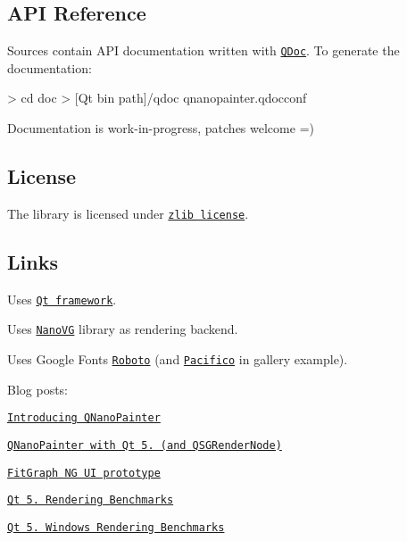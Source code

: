 \subsection*{A\+PI Reference}

Sources contain A\+PI documentation written with \href{http://doc.qt.io/qt-5/qdoc-index.html}{\tt Q\+Doc}. To generate the documentation\+:


\begin{DoxyCode}
> cd doc
> [Qt bin path]/qdoc qnanopainter.qdocconf 
\end{DoxyCode}
 Documentation is work-\/in-\/progress, patches welcome =)

\subsection*{License}

The library is licensed under \href{LICENSE.txt}{\tt zlib license}.

\subsection*{Links}


\begin{DoxyItemize}
\item Uses \href{http://www.qt.io}{\tt Qt framework}.
\item Uses \href{http://github.com/memononen/nanovg}{\tt Nano\+VG} library as rendering backend.
\item Uses Google Fonts \href{http://www.google.com/fonts/specimen/Roboto}{\tt Roboto} (and \href{http://www.google.com/fonts/specimen/Pacifico}{\tt Pacifico} in gallery example).
\item Blog posts\+:
\begin{DoxyItemize}
\item \href{http://kgronholm.blogspot.fi/2015/10/introducing-qnanopainter.html}{\tt Introducing Q\+Nano\+Painter}
\item \href{http://kgronholm.blogspot.fi/2017/03/qnanopainter-with-qt-58-and.html}{\tt Q\+Nano\+Painter with Qt 5. (and Q\+S\+G\+Render\+Node)}
\item \href{http://kgronholm.blogspot.fi/2017/10/fitgraph-ng-ui-prototype.html}{\tt Fit\+Graph NG UI prototype}
\item \href{http://kgronholm.blogspot.fi/2017/12/qt-510-rendering-benchmarks.html}{\tt Qt 5. Rendering Benchmarks}
\item \href{http://kgronholm.blogspot.fi/2018/01/qt-510-windows-rendering-benchmarks.html}{\tt Qt 5. Windows Rendering Benchmarks} 
\end{DoxyItemize}
\end{DoxyItemize}